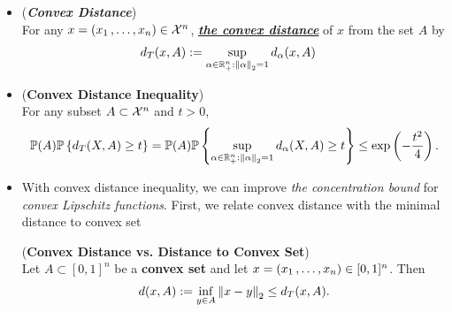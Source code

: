 \documentclass[11pt]{article}
\begin{document}
\begin{itemize}
\item \begin{definition}(\textbf{\emph{Convex Distance}})\\
For any $x = (x_1 \,{,}\ldots{,}\, x_n)  \in {\mathcal X}^n$, \underline{\emph{\textbf{the convex distance}}} of $x$ from the set $A$ by
\begin{align*}
d_{T}(x, A) &:=\sup_{\alpha \in {\mathbb R}_{+}^{n}: \left\|\alpha\right\|_{2} = 1}d_{\alpha}(x, A)
\end{align*}

\end{definition}

\item \begin{theorem} (\textbf{Convex Distance Inequality}) \citep{boucheron2013concentration}\\
For any subset $A \subset {\mathcal X}^n$ and $t > 0$,
\begin{align}
{\mathbb P}(A){\mathbb P}\left\{d_{T}(X, A)  \ge t\right\} = {\mathbb P}(A){\mathbb P}\left\{\sup_{\alpha \in {\mathbb R}_{+}^{n}: \left\|\alpha\right\|_{2} = 1}d_{\alpha}(X, A) \ge t\right\} \le  \exp\left(-\frac{t^2}{4}\right). \label{ineqn: convex_dist_inequality}
\end{align}
\end{theorem}

\item With convex distance inequality, we can improve \emph{the  concentration bound} for \emph{convex Lipschitz functions}. First, we relate convex distance with the minimal distance to convex set
\begin{lemma} \label{lem: convex_dist_bound_dist_convex_set} (\textbf{Convex Distance vs. Distance to Convex Set}) \citep{boucheron2013concentration}\\
Let $A \subset [0, 1]^n$ be a \textbf{convex set} and let $x = (x_1 \,{,}\ldots{,}\, x_n)  \in [0,1]^n$. Then
\begin{align}
 d(x, A):= \inf_{y \in A}\left\|x - y\right\|_{2} \le d_{T}(x, A).  \label{ineqn: convex_distance_bound_for_dist_convex_set}
\end{align}
\end{lemma}


\end{itemize}
\end{document}
